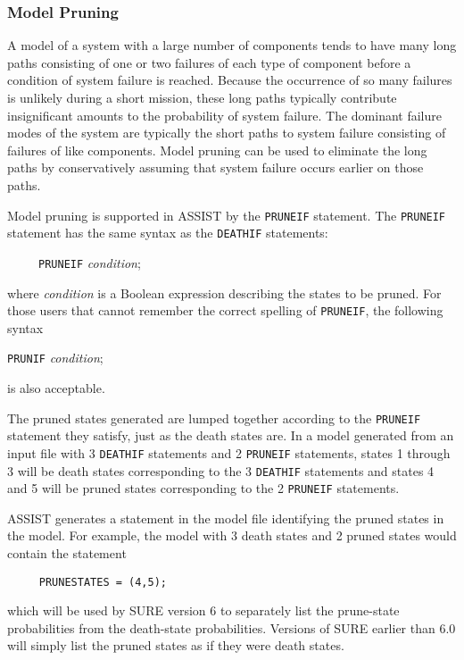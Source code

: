 \subsubsection{Model Pruning}
 
     A model of a system with a large number of components tends to have
many long paths consisting of one or two failures of each type of component
before a condition of system failure is reached.  Because the occurrence of
so many failures is unlikely during a short mission, these long paths
typically contribute insignificant amounts to the probability of system
failure.  The dominant failure modes of the system are typically the short
paths to system failure consisting of failures of like components.  Model
pruning can be used to eliminate the long paths by conservatively assuming
that system failure occurs earlier on those paths.
 
     Model pruning is supported in ASSIST by the \verb'PRUNEIF' statement.
The \verb'PRUNEIF' statement has the same syntax as the \verb'DEATHIF'
statements:
\begin{flushleft} 
~~~~~\verb'PRUNEIF' {\em condition};
\end{flushleft}
where {\em condition} is a Boolean expression describing the states to be
pruned.  For those users that cannot remember the correct spelling of
\verb'PRUNEIF', the following syntax
\begin{flushleft}
     \verb'PRUNIF' {\em condition};
\end{flushleft}
is also acceptable.
 
     The pruned states generated are lumped together according to the
\verb'PRUNEIF' statement they satisfy, just as the death states are.  In a
model generated from an input file with 3 \verb'DEATHIF' statements and 2
\verb'PRUNEIF' statements, states 1 through 3 will be death states
corresponding to the 3 \verb'DEATHIF' statements and states 4 and 5 will be
pruned states corresponding to the 2 \verb'PRUNEIF' statements.
 
     ASSIST generates a statement in the model file identifying the pruned
states in the model.  For example, the model with 3 death states and 2
pruned states would contain the statement
\begin{verbatim}
     PRUNESTATES = (4,5);
\end{verbatim}
which will be used by SURE version 6 to separately list the prune-state
probabilities from the death-state probabilities.  Versions of SURE earlier
than 6.0 will simply list the pruned states as if they were death states.
 
